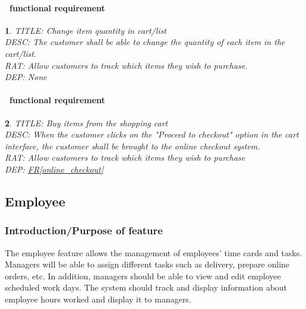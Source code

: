 \documentclass{scrreprt}
\theoremstyle{funreq}
\newtheorem{funreq}{}
\newcommand*{\reqref}[1]{\hyperref[#1]{FR\ref*{#1}}}
\begin{document}
	\paragraph[]{\Subsectionname ~functional requirement }
	\begin{funreq}
		\label{cart_changequantity}
		TITLE: Change item quantity in cart/list\\
		DESC: The customer shall be able to change the quantity of each item in the cart/list.\\
		RAT: Allow customers to track which items they wish to purchase.\\
		DEP: None
	\end{funreq}
	
	\paragraph[]{\Subsectionname ~functional requirement }
	\begin{funreq}
		\label{cart_buy}
		TITLE: Buy items from the shopping cart\\
		DESC: When the customer clicks on the "Proceed to checkout" option in the cart interface, the customer shall be brought to the online checkout system.\\
		RAT: Allow customers to track which items they wish to purchase\\
		DEP: \reqref{online_checkout}
	\end{funreq}
	
	\subsection{Employee}
	\subsubsection{Introduction/Purpose of feature}
	The employee feature allows the management of employees’ time cards and tasks. Managers will be able to assign different tasks such as delivery, prepare online orders, etc.  In addition, managers should be able to view and edit employee scheduled work days.  The system should track and display information about employee hours worked and display it to managers.
	
%	
%	
\end{document}
